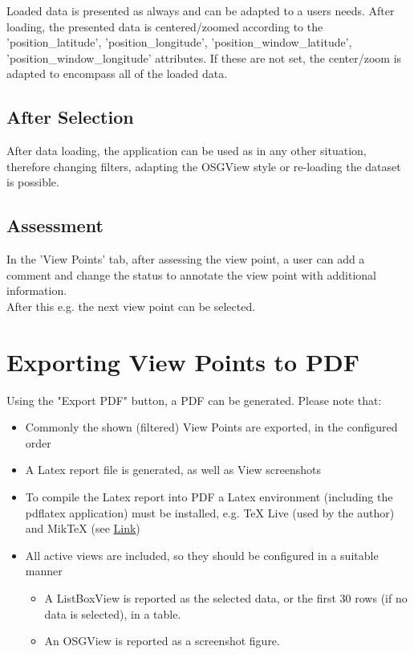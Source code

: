 Loaded data is presented as always and can be adapted to a users needs. After loading, the presented data is centered/zoomed according to the 'position\_latitude', 'position\_longitude', 'position\_window\_latitude', 'position\_window\_longitude' attributes. If these are not set, the center/zoom is adapted to encompass all of the loaded data.

\subsection{After Selection}

After data loading, the application can be used as in any other situation, therefore changing filters, adapting the OSGView style or re-loading the dataset is possible.

\subsection{Assessment}

In the 'View Points' tab, after assessing the view point, a user can add a comment and change the status to annotate the view point with additional information. \\

After this e.g. the next view point can be selected.

\section{Exporting View Points to PDF}
\label{sec:view_points_export_pdf} 

Using the "Export PDF" button, a PDF can be generated. Please note that:

\begin{itemize}  
\item Commonly the shown (filtered) View Points are exported, in the configured order
\item A Latex report file is generated, as well as View screenshots
\item To compile the Latex report into PDF a Latex environment (including the pdflatex application) must be installed, e.g. TeX Live (used by the author) and MikTeX (see \href{https://en.wikipedia.org/wiki/LaTeX}{Link})
\item All active views are included, so they should be configured in a suitable manner
\begin{itemize}  
\item A ListBoxView is reported as the selected data, or the first 30 rows (if no data is selected), in a table.
\item An OSGView is reported as a screenshot figure.
\end{itemize}
\end{itemize}
\ \\

